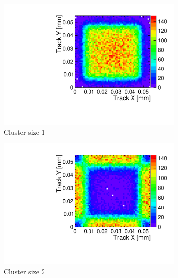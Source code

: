 \begin{figure}[htbp] \centering
  \begin{subfigure}[b]{0.23\textwidth}
    \includegraphics[width=\textwidth]{./figures/TestBeam/TrackPosWPixel_1hit_runW5_F1.pdf}
    \caption{Cluster size 1}
  \end{subfigure} \hfill
  \begin{subfigure}[b]{0.23\textwidth}
    \includegraphics[width=\textwidth]{./figures/TestBeam/TrackPosWPixel_2hit_runW5_F1.pdf}
    \caption{Cluster size 2}
  \end{subfigure} \hfill
  \begin{subfigure}[b]{0.23\textwidth}

\end{subfigure}
\end{figure}

